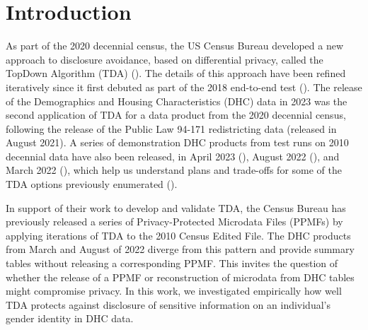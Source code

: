\documentclass{jpc} %
\theoremstyle{plain}\newtheorem{satz}[thm]{Satz} %
\begin{document}
\maketitle

\section*{Introduction}\label{S:one}

As part of the 2020 decennial census, the US Census Bureau developed a new approach to disclosure avoidance, based on differential privacy, called the TopDown Algorithm (TDA) (\cite{Abowd20222020}).  The details of this approach have been refined iteratively since it first debuted as part of the 2018 end-to-end test (\cite{garfinkel2019end}).  The release of the Demographics and Housing Characteristics (DHC) data in 2023 was the second application of TDA for a data product from the 2020 decennial census, following the release of the Public Law 94-171 redistricting data (released in August 2021).  A series of  demonstration DHC products from test runs on 2010 decennial data have also been released, in April 2023 (\cite{census2023demonstration}), August 2022 (\cite{census2022bdemonstration}), and March 2022 (\cite{census2022demonstration}), which help us understand plans and trade-offs for some of the TDA options previously enumerated  (\cite{petti2019differential}).

In support of their work to develop and validate TDA,  the Census Bureau has previously released a series of Privacy-Protected Microdata Files (PPMFs) by applying iterations of TDA to the 2010 Census Edited File.  The DHC products from March and August of 2022 diverge from this pattern and provide summary tables without releasing a corresponding PPMF.  This invites the question of whether the release of a PPMF or reconstruction of microdata from DHC tables might compromise privacy.  In this work, we investigated empirically how well TDA protects against disclosure of sensitive information on an individual's gender identity in DHC data.
\end{document}
